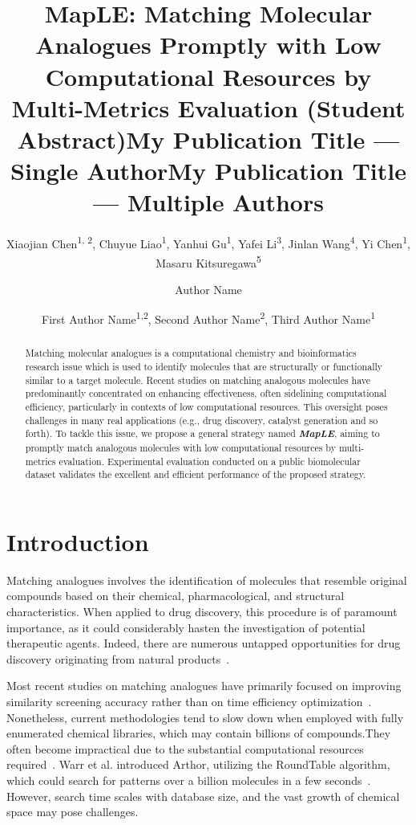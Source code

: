 \documentclass[letterpaper]{article} %
\title{MapLE: Matching Molecular Analogues Promptly with Low\\ Computational Resources by Multi-Metrics Evaluation (Student Abstract)}
\author{
    Xiaojian Chen\textsuperscript{\rm 1, 2}, 
    Chuyue Liao\textsuperscript{\rm 1},
    Yanhui Gu\textsuperscript{\rm 1}, 
    Yafei Li\textsuperscript{\rm 3}, 
    Jinlan Wang\textsuperscript{\rm 4},  
    Yi Chen\textsuperscript{\rm 1},
    Masaru Kitsuregawa\textsuperscript{\rm 5}
}
\title{My Publication Title --- Single Author}
\author {
    Author Name
}
\title{My Publication Title --- Multiple Authors}
\author {
    First Author Name\textsuperscript{\rm 1,\rm 2},
    Second Author Name\textsuperscript{\rm 2},
    Third Author Name\textsuperscript{\rm 1}
}
\begin{document}
\maketitle

\begin{abstract}
Matching molecular analogues is a computational chemistry and bioinformatics research issue which is used to identify molecules that are structurally or functionally similar to a target molecule. Recent studies on matching analogous molecules have predominantly concentrated on enhancing effectiveness, often sidelining computational efficiency, particularly in contexts of low computational resources. This oversight poses challenges in many real applications (e.g., drug discovery, catalyst generation and so forth). To tackle this issue, we propose a general strategy named \textbf{\textit{MapLE}}, aiming to promptly match analogous molecules with low computational resources by multi-metrics evaluation. Experimental evaluation conducted on a public biomolecular dataset validates the excellent and efficient performance of the proposed strategy.
\end{abstract}

\section{Introduction}
Matching analogues involves the identification of molecules that resemble original compounds based on their chemical, pharmacological, and structural characteristics. When applied to drug discovery, this procedure is of paramount importance, as it could considerably hasten the investigation of potential therapeutic agents. Indeed, there are numerous untapped opportunities for drug discovery originating from natural products~\cite{DeCorte2016}.

Most recent studies on matching analogues have primarily focused on improving similarity screening accuracy rather than on time efficiency optimization~\cite{Chen2023}. Nonetheless, current methodologies tend to slow down when employed with fully enumerated chemical libraries, which may contain billions of compounds.They often become impractical due to the substantial computational resources required~\cite{Sadybekov2023}.
Warr et al. introduced Arthor, utilizing the RoundTable algorithm, which could search for patterns over a billion molecules in a few seconds~\cite{Warr2022}. However, search time scales with database size, and the vast growth of chemical space may pose challenges.
\end{document}
